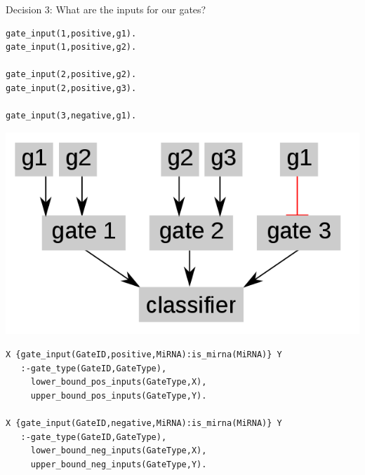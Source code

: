 \documentclass[10pt,dvipsnames]{beamer}
\begin{document}
\begin{frame}[fragile]{Decision 3: What are the inputs for our gates?}
\vspace{0.3cm}
\small
\begin{minipage}{0.45\textwidth}
\color{my_example_color}
\begin{verbatim}
gate_input(1,positive,g1).
gate_input(1,positive,g2).

gate_input(2,positive,g2).
gate_input(2,positive,g3).

gate_input(3,negative,g1).
\end{verbatim}
\end{minipage}
\hfill
\begin{minipage}{0.45\textwidth}
\begin{center}
\includegraphics[scale=0.2]{exp3.png}
\end{center}
\end{minipage}
\vspace{0.5cm}

\begin{Verbatim}
X {gate_input(GateID,positive,MiRNA):is_mirna(MiRNA)} Y 
   :-gate_type(GateID,GateType),
     lower_bound_pos_inputs(GateType,X), 
     upper_bound_pos_inputs(GateType,Y).

X {gate_input(GateID,negative,MiRNA):is_mirna(MiRNA)} Y 
   :-gate_type(GateID,GateType),
     lower_bound_neg_inputs(GateType,X),
     upper_bound_neg_inputs(GateType,Y).
\end{Verbatim}
\end{frame}
\end{document}
